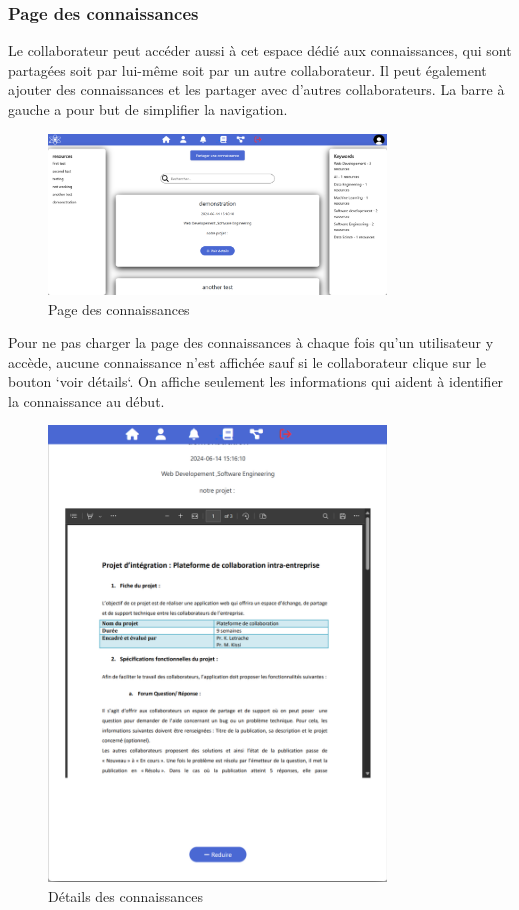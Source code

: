 \documentclass{article}
\begin{document}
                \subsubsection{Page des connaissances}
                    Le collaborateur peut accéder aussi à cet espace dédié aux connaissances, qui sont partagées soit par lui-même soit par un autre collaborateur. Il peut également ajouter des connaissances et les partager avec d'autres collaborateurs. La barre à gauche a pour but de simplifier la navigation.
                    \begin{figure}[h!]
                        \centering
                        \includegraphics[width=0.8\textwidth]{assets/webSite/base-de-connaissance.png}
                        \caption{Page des connaissances}
                    \end{figure}
                    \FloatBarrier
                    Pour ne pas charger la page des connaissances à chaque fois qu'un utilisateur y accède, aucune connaissance n'est affichée sauf si le collaborateur clique sur le bouton `voir détails`. On affiche seulement les informations qui aident à identifier la connaissance au début.
                    \begin{figure}[h!]
                        \centering
                        \includegraphics[width=0.8\textwidth]{assets/webSite/base-de-connaissance_demo.png}
                        \caption{Détails des connaissances}
                    \end{figure}
\end{document}
